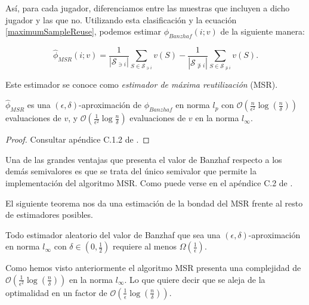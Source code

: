 Así, para cada jugador, diferenciamos entre las muestras
que incluyen a dicho jugador y las que no. Utilizando esta
clasificación y la ecuación \ref{maximumSampleReuse},
podemos estimar $\phi_{Banzhaf}(i;v)$ de la siguiente manera: 

\begin{equation*}
  \hat{\phi}_{MSR}(i;v) = \frac{1}{|\mathcal{S}_{\ni i}|}
  \sum_{S \in \mathcal{S}_{\ni i}} v(S) -
  \frac{1}{|\mathcal{S}_{\not \ni i}|}
  \sum_{S \in \mathcal{S}_{\not \ni i}} v(S).
\end{equation*}

Este estimador se conoce como \emph{estimador de máxima
reutilización} (MSR).
\begin{theorem}
  $\hat{\phi}_{MSR}$ es una $(\epsilon,\delta)$-aproximación
  de $\phi_{Banzhaf}$ en norma $l_p$ con $\mathcal{O}
  (\frac{n}{\epsilon^2} \log(\frac{n}{\delta}))$ evaluaciones
  de $v$, y $\mathcal{O}(\frac{1}{\epsilon^2}
  \log{\frac{n}{\delta}})$ evaluaciones de $v$ en la norma
  $l_{\infty}$.
\end{theorem}

\begin{proof}
  Consultar apéndice C.1.2 de \cite{dataBanzhaf}.
\end{proof}

Una de las grandes ventajas que presenta el valor
de Banzhaf respecto a los demás semivalores es que
se trata del único semivalor que permite la implementación
del algoritmo MSR. Como puede verse en el apéndice
C.2 de \cite{dataBanzhaf}.

El siguiente teorema nos da una estimación de la bondad del
MSR frente al resto de estimadores posibles.

\begin{theorem}
  Todo estimador aleatorio del valor de Banzhaf
  que sea una $(\epsilon,\delta)$-aproximación en norma
  $l_{\infty}$ con $\delta \in (0,\frac{1}{2})$ requiere
  al menos $\Omega(\frac{1}{\epsilon})$.
\end{theorem}

Como hemos visto anteriormente el algoritmo MSR presenta
una complejidad de $\mathcal{O}(\frac{1}{\epsilon^2}
\log(\frac{n}{\delta}))$ en la norma $l_{\infty}$.
Lo que quiere decir que se aleja de la optimalidad
en un factor de $\mathcal{O}(\frac{1}{\epsilon}
\log(\frac{n}{\delta}))$.